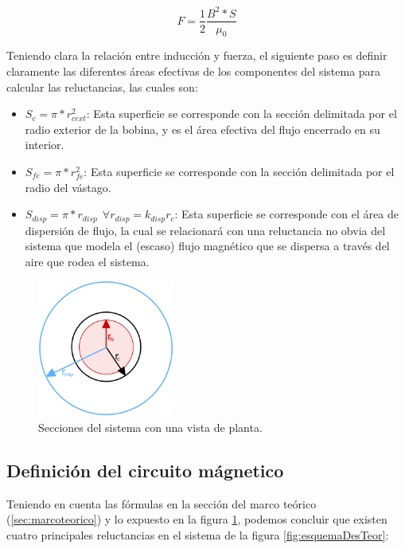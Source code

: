 \begin{center}
\[F=\frac{1}{2}\frac{B^2*S}{\mu_0}\]
\end{center}

Teniendo clara la relación entre inducción y fuerza, el siguiente paso es definir claramente las diferentes áreas efectivas de los componentes del sistema para calcular las reluctancias, las cuales son:

\begin{itemize}
    \item \(S_{c}=\pi *r_{cext}^2\): Esta superficie se corresponde con la sección delimitada por el radio exterior de la bobina, y es el área efectiva del flujo encerrado en su interior.
    \item \(S_{fe}=\pi *r_{fe}^2\): Esta superficie se corresponde con la sección delimitada por el radio del vástago.
    \item \(S_{disp}=\pi *r_{disp}~~\forall r_{disp} = k_{disp}r_c\): Esta superficie se corresponde con el área de dispersión de flujo, la cual se relacionará con una reluctancia no obvia del sistema que modela el (escaso) flujo magnético que se dispersa a través del aire que rodea el sistema.
\end{itemize}

\begin{figure}[H]
    \centering
    \includegraphics[width=4.5cm]{FigurasMemoria/areasFlujo.jpg}
    \caption{Secciones del sistema con una vista de planta.}
    \label{fig:areasFlujo} %
\end{figure}
\newpage
\subsection{Definición del circuito mágnetico}

Teniendo en cuenta las fórmulas en la sección del marco teórico (\ref{sec:marcoteorico}) y lo expuesto en la figura \ref{fig:areasFlujo}, podemos concluir que existen cuatro principales reluctancias en el sistema de la figura \ref{fig:esquemaDesTeor}:

